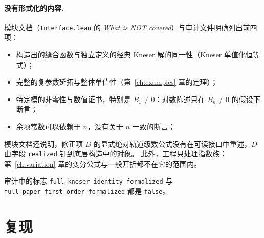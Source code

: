 \paragraph{没有形式化的内容.} 模块文档（\texttt{Interface.lean} 的 \emph{What is NOT covered}）与审计文件明确列出前四项：
\begin{itemize}
\item 构造出的缝合函数与独立定义的经典 Kneser 解的同一性（Kneser 单值化恒等式）；
\item 完整的复参数延拓与整体单值性（第~\ref{ch:examples} 章的定理）；
\item 特定模的非零性与数值证书，特别是 $B_1\ne0$：对数陈述只在 $B_n\ne0$ 的假设下断言；
\item 余项常数可以依赖于 $n$，没有关于 $n$ 一致的断言；
\end{itemize}
模块文档还说明，修正项 $D$ 的显式绝对轨道级数公式没有在可读接口中重述，$D$ 由字段 \texttt{realized} 钉到底层构造中的对象。
此外，工程只处理指数族：第~\ref{ch:variation} 章的变分公式与一般开折都不在它的范围内。
\begin{sloppypar}审计中的标志 \texttt{full\_\allowbreak{}kneser\_\allowbreak{}identity\_\allowbreak{}formalized} 与 \texttt{full\_\allowbreak{}paper\_\allowbreak{}first\_\allowbreak{}order\_\allowbreak{}formalized} 都是 \texttt{false}。\end{sloppypar}

\section{复现}\label{ch11:sec:reproduce}


